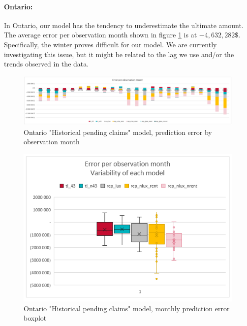	\paragraph{Ontario:}
		In Ontario, our model has the tendency to underestimate the ultimate amount. The average error per observation month shown in figure \ref{Fig_ON_current_er_by_month} is at $-4,632,282\$ $. Specifically, the winter proves difficult for our model. We are currently investigating this issue, but it might be related to the lag we use and/or the trends observed in the data.
		\begin{figure}[H]
			\begin{center}
				\includegraphics[scale=0.4]{Graphiques/ON_current_model_by_month} 
				\renewcommand{\figurename}{Figure}
				\caption{Ontario "Historical  pending claims" model, prediction error by observation month}\label{Fig_ON_current_er_by_month}
			\end{center}
		\end{figure}
		\begin{figure}[H]
			\begin{center}
				\includegraphics[scale=0.4]{Graphiques/ON_current_model_mustach} 
				\renewcommand{\figurename}{Figure}
				\caption{Ontario "Historical  pending claims" model, monthly prediction error boxplot}\label{Fig_ON_current_er_boxplot}
			\end{center}
		\end{figure}
